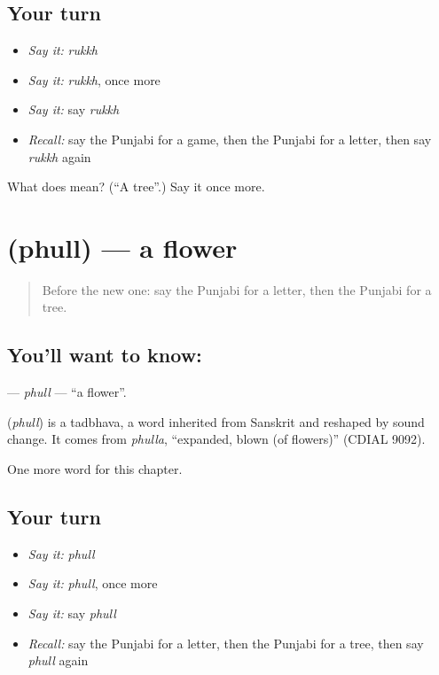 \subsection*{Your turn}
\begin{itemize}
\raggedright
  \item \emph{Say it:} \emph{rukkh}
  \item \emph{Say it:} \emph{rukkh}, once more
  \item \emph{Say it:} say \emph{rukkh}
  \item \emph{Recall:} say the Punjabi for a game, then the Punjabi for a letter, then say \emph{rukkh} again
\end{itemize}

\begin{tcolorbox}[breakable,colback=teal!4,colframe=teal!35!black,title={Before you move on}]
What does  mean? (\textquotedblleft{}A tree\textquotedblright{}.) Say it once more.
\end{tcolorbox}
\section[\texorpdfstring{\pa{ਫੁੱਲ} (phull)}{ਫੁੱਲ (phull)}]{ (phull) — a flower}

\label{lesson:PA-C73-phull}



\begin{quote}
Before the new one: say the Punjabi for a letter, then the Punjabi for a tree.
\end{quote}

\subsection*{You'll want to know: }
\textbf{} — \emph{phull} — \textquotedblleft{}a flower\textquotedblright{}.

\begin{cousinweb}
\textbf{} (\emph{phull}) is a tadbhava, a word inherited from Sanskrit and reshaped by sound change. It comes from \emph{phulla}, \textquotedblleft{}expanded, blown (of flowers)\textquotedblright{} (CDIAL 9092).
\end{cousinweb}

\begin{grammarlens}[title={What you've built}]
One more word for this chapter.
\end{grammarlens}

\subsection*{Your turn}
\begin{itemize}
\raggedright
  \item \emph{Say it:} \emph{phull}
  \item \emph{Say it:} \emph{phull}, once more
  \item \emph{Say it:} say \emph{phull}
  \item \emph{Recall:} say the Punjabi for a letter, then the Punjabi for a tree, then say \emph{phull} again
\end{itemize}

